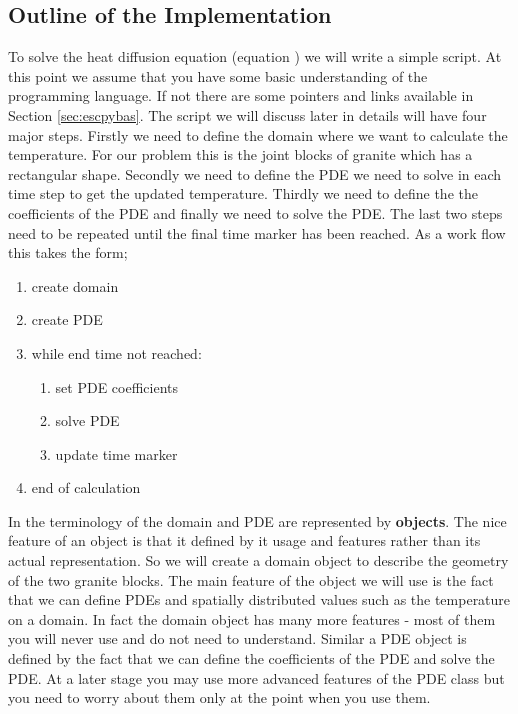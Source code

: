 \subsection{Outline of the Implementation}
\label{sec:outline}
To solve the heat diffusion equation (equation ) we will write a simple \pyt script. At this point we assume that you have some basic understanding of the \pyt programming language. If not there are some pointers and links available in Section \ref{sec:escpybas}. The script we will discuss later in details will have four major steps. Firstly we need to define the domain where we want to 
calculate the temperature. For our problem this is the joint blocks of granite which has a rectangular shape. Secondly we need to define the PDE 
we need to solve in each time step to get the updated temperature. Thirdly we need to define the the coefficients of the PDE and finally we need to solve the PDE. The last two steps need to be repeated until the final time marker has been reached. As a work flow this takes the form;
\begin{enumerate}
 \item create domain
 \item create PDE
 \item while end time not reached:
\begin{enumerate}
 \item set PDE coefficients
 \item solve PDE
 \item update time marker
\end{enumerate}
\item end of calculation
\end{enumerate}
In the terminology of \pyt the domain and PDE are represented by \textbf{objects}. The nice feature of an object is that it defined by it usage and features
rather than its actual representation. So we will create a domain object to describe the geometry of the two
granite blocks. The main feature 
of the object we will use is the fact that we can define PDEs and spatially distributed values such as the temperature 
on a domain. In fact the domain object has many more features - most of them you will 
never use and do not need to understand. Similar a PDE object is defined by the fact that we can define the coefficients of the PDE and solve the PDE. At a 
later stage you may use more advanced features of the PDE class but you need to worry about them only at the point when you use them.


